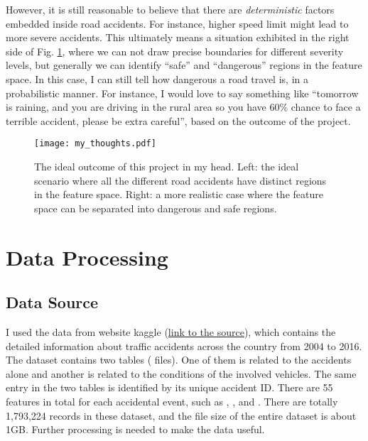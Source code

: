 \documentclass[12pt,a4paper]{article}
\begin{document}
However, it is still reasonable to believe that there are \emph{deterministic} factors embedded inside road accidents. For instance, higher speed limit might lead to more severe accidents. This ultimately means a situation exhibited in the right side of Fig. \ref{figExpect}, where we can not draw precise boundaries for different severity levels, but generally we can identify ``safe'' and ``dangerous'' regions in the feature space. In this case, I can still tell how dangerous a road travel is, in a probabilistic manner. For instance, I would love to say something like ``tomorrow is raining, and you are driving in the rural area so you have 60\% chance to face a terrible accident, please be extra careful'', based on the outcome of the project.

\begin{figure}
    \centering
    \texttt{[image: my\_thoughts.pdf]}
    \caption{The ideal outcome of this project in my head. Left: the ideal scenario where all the different road accidents have distinct regions in the feature space. Right: a more realistic case where the feature space can be separated into dangerous and safe regions.}
    \label{figExpect}
\end{figure}

\newpage

\section{Data Processing}

\subsection{Data Source}

I used the data from website kaggle (\href{https://www.kaggle.com/tsiaras/uk-road-safety-accidents-and-vehicles?select=Accident_Information.csv}{link to the source}), which contains the detailed information about traffic accidents across the country from 2004 to 2016. 
The dataset contains two tables ( files). One of them is related to the accidents alone and another is related to the conditions of the involved vehicles. The same entry in the two tables is identified by its unique accident ID. There are 55 features in total for each accidental event, such as , , and . There are totally 1,793,224  records in these dataset, and the file size of the entire dataset is about 1GB. Further processing is needed to make the data useful.
\end{document}
